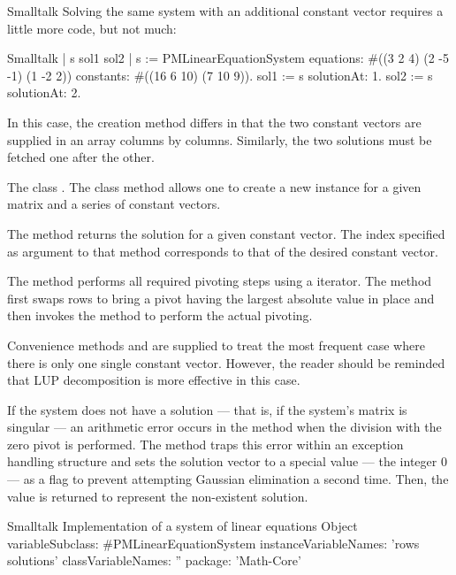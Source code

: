 \begin{displaycode}{Smalltalk}
Solving the same system with an additional constant vector
requires a little more code, but not much:
\begin{displaycode}{Smalltalk}
 | s sol1 sol2 |
 s := PMLinearEquationSystem equations: #((3 2 4) (2 -5 -1) (1 -2 2))
                        constants: #((16 6 10)
                                     (7 10 9)).
 sol1 := s solutionAt: 1.
 sol2 := s solutionAt: 2.
\end{displaycode}
In this case, the creation method differs in that the two constant
vectors are supplied in an array columns by columns. Similarly,
the two solutions must be fetched one after the other.

The class .
The class method  allows one to create a new instance for a given
matrix and a series of constant vectors.

The method  returns the solution for a given constant vector.
The index specified as argument to that method corresponds to that of the desired constant vector.

The method  performs all required pivoting steps using
a  iterator. The method  first swaps
rows to bring a pivot having the largest absolute value in place
and then invokes the method  to perform the actual
pivoting.

Convenience methods  and 
are supplied to treat the most frequent case where there is only
one single constant vector.
However, the reader should be reminded that LUP decomposition is more effective in this case.

If the system does not have a solution --- that is, if the
system's matrix is singular --- an arithmetic error occurs in the
method  when the division with the zero pivot is
performed. The method  traps this error within an
exception handling structure and sets the solution vector to a
special value --- the integer 0 --- as a flag to prevent
attempting Gaussian elimination a second time. Then, the value
 is returned to represent the non-existent solution.

\begin{listing}[label=lst:lineqs]{Smalltalk}
{Implementation of a system of linear equations}
Object variableSubclass: #PMLinearEquationSystem
   instanceVariableNames: 'rows solutions'
   classVariableNames: ''
   package: 'Math-Core'
\end{listing}


\end{displaycode}
